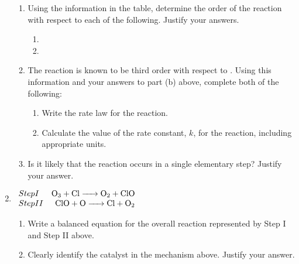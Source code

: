 \documentclass[12pt]{article}
\begin{document}
\begin{enumerate}
\begin{enumerate}
      \item Using the information in the table, determine the order of the reaction with respect to each of the following. Justify your answers.

        \begin{enumerate}

          \item {}

          \item {}

        \end{enumerate}

      \item The reaction is known to be third order with respect to . Using this information and your answers to part (b) above, complete both of the following:

        \begin{enumerate}

          \item Write the rate law for the reaction.

          \item Calculate the value of the rate constant, $k$, for the reaction, including appropriate units.

        \end{enumerate}

      \item Is it likely that the reaction occurs in a single elementary step? Justify your answer.

    \end{enumerate}

  \item \begin{center}
      $\begin{array}{l r} Step I & \ce{O3 + Cl -> O2 + ClO} \\ Step II & \ce{ClO + O -> Cl + O2}  \end{array}$
    \end{center}

    \begin{enumerate}

      \item Write a balanced equation for the overall reaction represented by Step I and Step II above.

      \item Clearly identify the catalyst in the mechanism above. Justify your answer.


\end{enumerate}
\end{enumerate}
\end{document}
